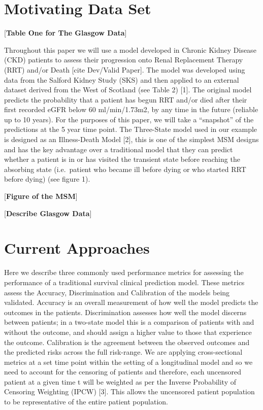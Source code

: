 \documentclass[12pt,twoside]{reedthesis}
\begin{document}
\hypertarget{motivating-data-set}{%
\section{Motivating Data Set}\label{motivating-data-set}}

{[}\textbf{Table One for The Glasgow Data}{]}

Throughout this paper we will use a model developed in Chronic Kidney Disease (CKD) patients to assess their progression onto Renal Replacement Therapy (RRT) and/or Death {[}cite Dev/Valid Paper{]}. The model was developed using data from the Salford Kidney Study (SKS) and then applied to an external dataset derived from the West of Scotland (see Table 2) {[}1{]}. The original model predicts the probability that a patient has begun RRT and/or died after their first recorded eGFR below 60 ml/min/1.73m2, by any time in the future (reliable up to 10 years). For the purposes of this paper, we will take a ``snapshot'' of the predictions at the 5 year time point.
The Three-State model used in our example is designed as an Illness-Death Model {[}2{]}, this is one of the simplest MSM designs and has the key advantage over a traditional model that they can predict whether a patient is in or has visited the transient state before reaching the absorbing state (i.e.~patient who became ill before dying or who started RRT before dying) (see figure 1).

{[}\textbf{Figure of the MSM}{]}

{[}\textbf{Describe Glasgow Data}{]}

\hypertarget{current-approaches}{%
\section{Current Approaches}\label{current-approaches}}

Here we describe three commonly used performance metrics for assessing the performance of a traditional survival clinical prediction model. These metrics assess the Accuracy, Discrimination and Calibration of the models being validated. Accuracy is an overall measurement of how well the model predicts the outcomes in the patients. Discrimination assesses how well the model discerns between patients; in a two-state model this is a comparison of patients with and without the outcome, and should assign a higher value to those that experience the outcome. Calibration is the agreement between the observed outcomes and the predicted risks across the full risk-range.
We are applying cross-sectional metrics at a set time point within the setting of a longitudinal model and so we need to account for the censoring of patients and therefore, each uncensored patient at a given time t will be weighted as per the Inverse Probability of Censoring Weighting (IPCW) {[}3{]}. This allows the uncensored patient population to be representative of the entire patient population.
\end{document}
